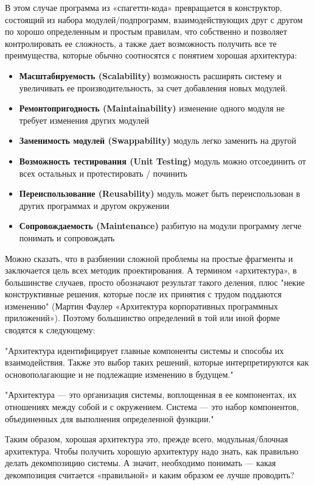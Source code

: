 \documentclass[a4paper]{article}
\begin{document}
В этом случае программа из «спагетти-кода» превращается в конструктор, состоящий из набора модулей/подпрограмм, взаимодействующих друг с другом по хорошо определенным и простым правилам, что собственно и позволяет контролировать ее сложность, а также дает возможность получить все те преимущества, которые обычно соотносятся с понятием хорошая архитектура:
\begin{itemize}
    \item \textbf{Масштабируемость (Scalability)}
    возможность расширять систему и увеличивать ее производительность, за счет добавления новых модулей.
    \item \textbf{Ремонтопригодность (Maintainability)}
    изменение одного модуля не требует изменения других модулей
    \item \textbf{Заменимость модулей (Swappability)}
    модуль легко заменить на другой
    \item \textbf{Возможность тестирования (Unit Testing)}
    модуль можно отсоединить от всех остальных и протестировать / починить
    \item \textbf{Переиспользование (Reusability)}
    модуль может быть переиспользован в других программах и другом окружении
    \item \textbf{Сопровождаемость (Maintenance)}
    разбитую на модули программу легче понимать и сопровождать
\end{itemize}

Можно сказать, что в разбиении сложной проблемы на простые фрагменты и заключается цель всех методик проектирования. А термином «архитектура», в большинстве случаев, просто обозначают результат такого деления, плюс "некие конструктивные решения, которые после их принятия с трудом поддаются изменению" (Мартин Фаулер «Архитектура корпоративных программных приложений»). Поэтому большинство определений в той или иной форме сводятся к следующему:

"Архитектура идентифицирует главные компоненты системы и способы их взаимодействия. Также это выбор таких решений, которые интерпретируются как основополагающие и не подлежащие изменению в будущем."

"Архитектура — это организация системы, воплощенная в ее компонентах, их отношениях между собой и с окружением.
Система — это набор компонентов, объединенных для выполнения определенной функции."

Таким образом, хорошая архитектура это, прежде всего, модульная/блочная архитектура. Чтобы получить хорошую архитектуру надо знать, как правильно делать декомпозицию системы. А значит, необходимо понимать — какая декомпозиция считается «правильной» и каким образом ее лучше проводить?
\end{document}
